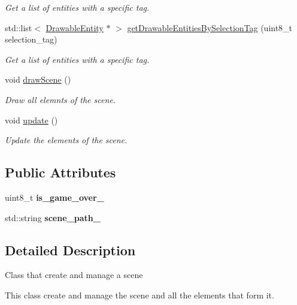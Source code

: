 \begin{DoxyCompactItemize}
\begin{DoxyCompactList}\small\item\em Get a list of entities with a specific tag. \end{DoxyCompactList}\item 
std\+::list$<$ \hyperlink{class_drawable_entity}{Drawable\+Entity} $\ast$ $>$ \hyperlink{class_scene_a03b92c636fdf1158bd7408e1c56edd7e}{get\+Drawable\+Entities\+By\+Selection\+Tag} (uint8\+\_\+t selection\+\_\+tag)
\begin{DoxyCompactList}\small\item\em Get a list of entities with a specific tag. \end{DoxyCompactList}\item 
void \hyperlink{class_scene_ae27f4327ca363cc9cad8ab553504e2d5}{draw\+Scene} ()
\begin{DoxyCompactList}\small\item\em Draw all elemnts of the scene. \end{DoxyCompactList}\item 
void \hyperlink{class_scene_aa24c7e636c10e4e42650c1374b90bb80}{update} ()
\begin{DoxyCompactList}\small\item\em Update the elements of the scene. \end{DoxyCompactList}\end{DoxyCompactItemize}
\subsection*{Public Attributes}
\begin{DoxyCompactItemize}
\item 
\mbox{\label{class_scene_abdb8454b82384169c1ea58773a542b39}} 
uint8\+\_\+t {\bfseries is\+\_\+game\+\_\+over\+\_\+}
\item 
\mbox{\label{class_scene_a9373f97e6410aafccfccf2315a278764}} 
std\+::string {\bfseries scene\+\_\+path\+\_\+}
\end{DoxyCompactItemize}


\subsection{Detailed Description}
Class that create and manage a scene

This class create and manage the scene and all the elements that form it. 

